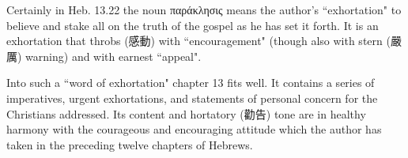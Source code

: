 Certainly in Heb. 13.22 the noun παράκλησις means the author's ``exhortation"
to believe and stake all on the truth of the gospel as he has set it forth.
It is an exhortation that throbs (感動) with ``encouragement" (though also with
stern (嚴厲) warning) and with earnest ``appeal".

Into such a ``word of exhortation" chapter 13 fits well.
It contains a series of imperatives, urgent exhortations, and statements of
personal concern for the Christians addressed.
Its content and hortatory (勸告) tone are in healthy harmony with the
courageous and encouraging attitude which the author has taken in the preceding
twelve chapters of Hebrews.

